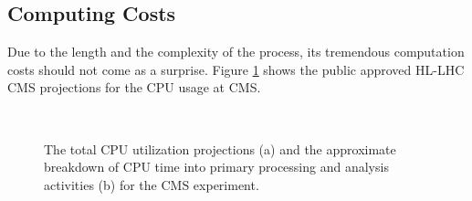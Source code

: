 \subsection{Computing Costs}

Due to the length and the complexity of the process, its tremendous computation costs should not come as a surprise. Figure \ref{fig:cpuusage} shows the public approved HL-LHC CMS projections for the CPU usage at CMS.

\begin{figure}
    \myfloatalign
     \\
    \caption[Computing estimates]{The total CPU utilization projections (a) and the approximate breakdown of CPU time into primary processing and analysis activities (b) for the CMS experiment.}\label{fig:cpuusage}
\end{figure}

